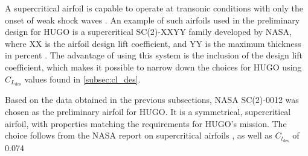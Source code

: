 A supercritical airfoil is capable to operate at transonic conditions with only the onset of weak shock waves \cite{Harris1990}. An example of such airfoils used in the preliminary design for HUGO is a supercritical SC(2)-XXYY family developed by NASA, where XX is the airfoil design lift coefficient, and YY is the maximum thickness in percent \cite{Harris1990}. The advantage of using this system is the inclusion of the design lift coefficient, which makes it possible to narrow down the choices for HUGO using $C_{L_\text{des}}$ values found in \autoref{subsec:cl_des}.

Based on the data obtained in the previous subsections, NASA SC(2)-0012 was chosen as the preliminary airfoil for HUGO. It is a symmetrical, supercritical airfoil, with properties matching the requirements for HUGO's mission. The choice follows from the NASA report on supercritical airfoils \cite{Harris1990}, as well as $C_{l_\text{des}}$ of 0.074



